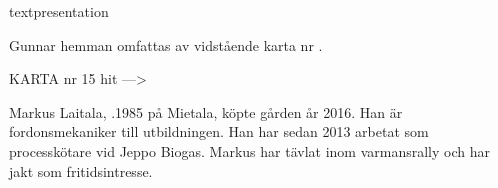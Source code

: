 

textpresentation


Gunnar hemman omfattas av vidstående karta nr .


KARTA nr 15 hit --->





Markus Laitala, .1985 på Mietala, köpte gården år 2016. Han är fordonsmekaniker till utbildningen. Han har sedan 2013 arbetat som processkötare vid Jeppo Biogas. Markus har tävlat inom varmansrally och har jakt som fritidsintresse.

\jhoccupant{}{}{}
